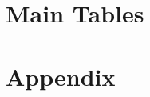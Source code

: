 \documentclass[12pt]{article}
\begin{document}
\section*{Main Tables}

\clearpage

\clearpage

\clearpage

\section*{Appendix}

\clearpage

\clearpage

\clearpage

\clearpage

\clearpage

\clearpage

\clearpage

\clearpage

\clearpage

\clearpage
\begingroup
\setlength{\tabcolsep}{3pt}  %

\endgroup
\end{document}
